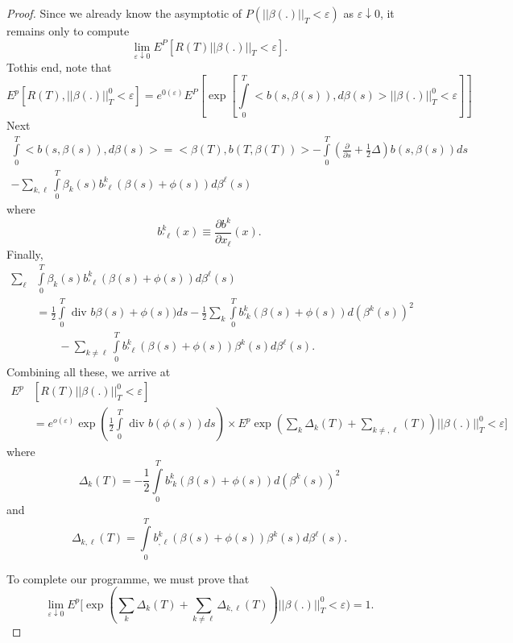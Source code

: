 \begin{proof}
Since we already know the asymptotic of $P( || \beta ( . ) ||_T <
\varepsilon)$ as $\varepsilon \downarrow 0$, it remains only to
compute  
$$
\lim_{\varepsilon \downarrow 0} E^P[R(T) || \beta (.) ||_T <
  \varepsilon ]. 
$$
To\pageoriginale this end, note that 
{\fontsize{10pt}{12pt}\selectfont
$$
E^p[R(T), || \beta(.)  || ^0_T < \varepsilon]= e^{0 (\varepsilon)}E^P
[\exp[\int\limits_{0}^T < b (s, \beta(s)), d \beta(s) > || \beta (.)
    ||^0_T < \varepsilon]] 
$$}\relax
Next
{\fontsize{10pt}{12pt}\selectfont
\begin{gather*}
\int\limits_{0}^T< b(s, \beta(s)), d \beta (s) > = < \beta (T), b (T,
\beta(T)) >  - \int\limits_{0}^T( \frac{\partial}{\partial s} +
\frac{1}{2} \Delta )b(s, \beta(s)) ds\\ 
- \sum_{k, \ell} \int\limits_{0}^T \beta_k(s) b^k_{'\ell}(\beta(s) +
\phi(s)) d \beta^\ell(s) 
\end{gather*}}\relax
where
$$
b^k_{'\ell} (x) \equiv \frac{\partial b^k}{\partial x_\ell}(x). 
$$
Finally,
\begin{align*}
\sum_\ell & \int\limits_{0}^T \beta_k (s) b_{'\ell}^k (\beta(s) +
\phi(s)) d \beta^\ell (s) \\ 
& =\frac{1}{2} \int\limits_{0}^T \text{ div } b \beta(s) + \phi(s)) ds -
\frac{1}{2} \sum_{k} \int\limits_{0}^T b_{'k}^k (\beta(s) + \phi(s)) d
(\beta^k (s))^2\\ 
& \qquad - \sum_{k \neq \ell} \int\limits_{0}^T b_{'\ell}^k (\beta(s) +
\phi(s)) \beta^k(s) d \beta^\ell(s). 
\end{align*}
Combining all these, we arrive at 
{\fontsize{10pt}{12pt}\selectfont
\begin{align*}
 E^p & [R(T) || \beta (.)||^0_T < \varepsilon]\\
& = e^{o(\varepsilon)} \exp( \frac{1}{2} \int\limits_{0}^T \text{ div }
 b(\phi(s)) ds) \times E^p \exp (\sum_{k} \Delta_{k} (T) +
 \sum_{k\neq, \ell}(T)) ||  \beta (.) ||^0_T < \varepsilon]
\end{align*}}\relax
where
$$
\Delta_k (T) =- \frac{1}{2} \int\limits_{0}^T b_{'k}^k ( \beta(s) +
\phi(s)) d( \beta^k(s))^2 
$$
and
$$
\Delta _{k, \ell}(T)= \int\limits_{0}^T b ^k _{, \ell}( \beta (s) +
\phi (s)) \beta^k (s) d \beta ^{\ell}(s). 
$$\pageoriginale

To complete our programme, we must prove that 
$$
\lim_{ \varepsilon \downarrow 0} E^p[\exp ( \sum _{k} \Delta _{k} (T)
  + \sum_{ k \neq \ell} \Delta _{k, \ell}(T)) || \beta (.) ||_T^0 <
  \varepsilon  ) = 1 . 
$$
\end{proof}

